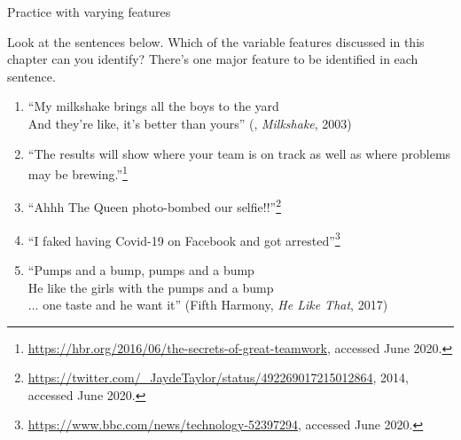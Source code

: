 \begin{exercises}{Practice with varying features}\label{exercise-practice-features}

Look at the sentences below. Which of the variable features discussed in this chapter can you identify? There's one major feature to be identified in each sentence.

\begin{enumerate}
    \item ``My milkshake brings all the boys to the yard\\
    And they're like, it's better than yours'' (, \emph{Milkshake}, 2003)
    \item ``The results will show where your team is on track as well as where problems may be brewing.''\footnote{\url{https://hbr.org/2016/06/the-secrets-of-great-teamwork}, accessed June 2020.}
    \item ``Ahhh The Queen photo-bombed our selfie!!''\footnote{\url{https://twitter.com/_JaydeTaylor/status/492269017215012864}, 2014, accessed June 2020.}
    \item ``I faked having Covid-19 on Facebook and got arrested''\footnote{\url{https://www.bbc.com/news/technology-52397294}, accessed June 2020.}
    \item ``Pumps and a bump, pumps and a bump\\
    He like the girls with the pumps and a bump\\
    ... one taste and he want it'' (Fifth Harmony, \emph{He Like That}, 2017)
\end{enumerate}
\end{exercises}
\newpage
\largerpage[2]
